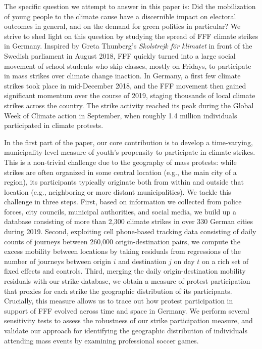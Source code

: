 The specific question we attempt to answer in this paper is: Did the mobilization of young people to the climate cause have a discernible impact on electoral outcomes in general, and on the demand for green politics in particular? We strive to shed light on this question by studying the spread of FFF climate strikes in Germany. Inspired by Greta Thunberg's \emph{Skolstrejk f\"{o}r klimatet} in front of the Swedish parliament in August 2018, FFF quickly turned into a large social movement of school students who skip classes, mostly on Fridays, to participate in mass strikes over climate change inaction. In Germany, a first few climate strikes took place in mid-December 2018, and the FFF movement then gained significant momentum over the course of 2019, staging thousands of local climate strikes across the country. The strike activity reached its peak during the Global Week of Climate action in September, when roughly 1.4 million individuals participated in climate protests.  

In the first part of the paper, our core contribution is to develop a time-varying, municipality-level measure of youth's propensity to participate in climate strikes. This is a non-trivial challenge due to the geography of mass protests: while strikes are often organized in some central location (e.g., the main city of a region), its participants typically originate both from within and outside that location (e.g., neighboring or more distant municipalities). We tackle this challenge in three steps. First, based on information we collected from police forces, city councils, municipal authorities, and social media, we build up a database consisting of more than 2,300 climate strikes in over 330 German cities during 2019. Second, exploiting cell phone-based tracking data consisting of daily counts of journeys between 260,000 origin-destination pairs, we compute the excess mobility between locations by taking residuals from regressions of the number of journeys between origin $i$ and destination $j$ on day $t$ on a rich set of fixed effects and controls. Third, merging the daily origin-destination mobility residuals with our strike database, we obtain a measure of protest participation that proxies for each strike the geographic distribution of its participants. Crucially, this measure allows us to trace out how protest participation in support of FFF evolved across time and space in Germany. We perform several sensitivity tests to assess the robustness of our strike participation measure, and validate our approach for identifying the geographic distribution of individuals attending mass events by examining professional soccer games.  

